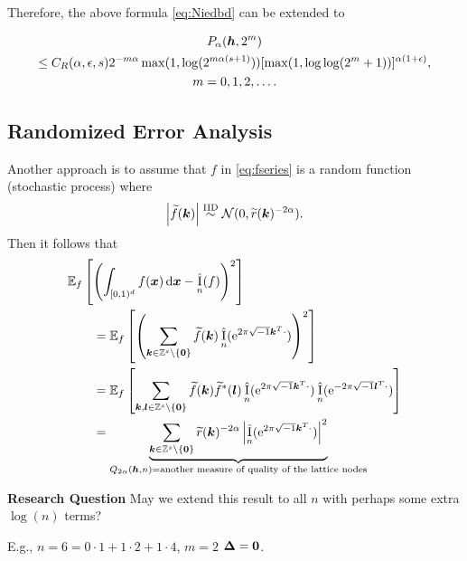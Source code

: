 \documentclass{amsart}
\newcommand{\tr}{\widetilde{r}}
\newcommand{\appxintn}{\appxint_n}
\DeclareMathOperator{\appxint}{\hat{I}}
\begin{document}
Therefore, the above formula \eqref{eq:Niedbd} can be extended to

\begin{multline}
    P_{\alpha}(\boldsymbol{h},2^m) \\
    \le C_{R}(\alpha,\epsilon,s)
    2^{-m\alpha}\max(1, \log(2^{m\alpha(s+1)})) [\max(1,\log \log (
    2^m+1))]^{\alpha(1+\epsilon)}, \\ m =0, 1, 2,\ldots.
\end{multline}

\subsection{Randomized Error Analysis}
Another approach is to assume that $f$ in \eqref{eq:fseries} is a random function (stochastic process) where 
\begin{equation}
    \abs{\tf(\vk)} \IIDsim \cn(0,\tr(\vk)^{-2\alpha}).
\end{equation}
Then it follows that 
\begin{align*}
    \MoveEqLeft{\Ex_f\left[\left(\int_{[0,1)^d} f(\vx) \, \dif \vx - \appxintn(f) \right)^2\right]} \\
    & = 
    \Ex_f\left[\left(\sum_{\vk \in \integers^s \setminus\{\vzero\}} \tf(\vk) \appxintn(\me^{2 \pi \sqrt{-1} \vk^T \cdot})\right)^2\right] \\
     & = 
    \Ex_f\left[\sum_{\vk,\vl \in \integers^s \setminus\{\vzero\}} \tf(\vk) \tf^*(\vl) \appxintn(\me^{2 \pi \sqrt{-1} \vk^T \cdot}) \appxintn(\me^{-2 \pi \sqrt{-1} \vl^T \cdot})\right] \\
    & = \underbrace{\sum_{\vk\in \integers^s \setminus\{\vzero\}} \tr(\vk)^{-2\alpha} \abs{\appxintn(\me^{2 \pi \sqrt{-1} \vk^T \cdot})}^2}_{Q_{2\alpha}(\vh,n) = \text{another measure of quality of the lattice nodes}}  \\
\end{align*}

\textbf{Research Question}  May we extend this result to all $n$ with perhaps some extra $\log(n)$ terms?

E.g.,  $n =6 = 0\cdot 1 + 1 \cdot 2 + 1 \cdot 4$, $m = 2$ $\boldsymbol{\Delta} = \boldsymbol{0}$.
\end{document}

